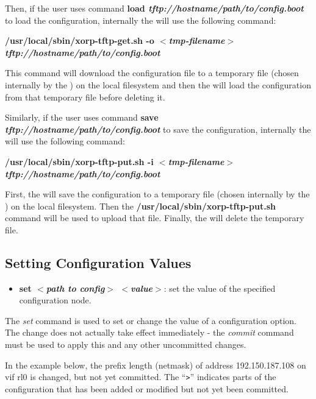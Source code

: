 Then, if the user uses \xorpsh command
\textbf{load \textit{tftp://hostname/path/to/config.boot}}
to load the configuration, internally the \rtrmgr will use the following
command:

\textbf{/usr/local/sbin/xorp-tftp-get.sh -o $<$\textit{tmp-filename}$>$
\textit{tftp://hostname/path/to/config.boot}}

This command will download the configuration file to a temporary file (chosen
internally by the \rtrmgr) on the local filesystem and then the \rtrmgr will
load the configuration from that temporary file before deleting it.

Similarly, if the user uses \xorpsh command
\textbf{save \textit{tftp://hostname/path/to/config.boot}}
to save the configuration, internally the \rtrmgr will use the following
command:

\textbf{/usr/local/sbin/xorp-tftp-put.sh -i $<$\textit{tmp-filename}$>$
\textit{tftp://hostname/path/to/config.boot}}

First, the \rtrmgr will save the configuration to a temporary file (chosen
internally by the \rtrmgr) on the local filesystem. Then the
\textbf{/usr/local/sbin/xorp-tftp-put.sh} command will be used to upload that
file. Finally, the \rtrmgr will delete the temporary file.

\newpage
\subsection{Setting Configuration Values}

\begin{itemize}
\item \textbf{set $<$\textit{path to config}$>$
$<$\textit{value}$>$}: set the value of the specified configuration
node.
\end{itemize}
The \emph{set} command is used to set or change the value of a configuration
option.  The change does not actually take effect immediately - the
\emph{commit} command must be used to apply this and any other uncommitted
changes.

In the example below, the prefix length (netmask) of address
192.150.187.108 on vif rl0 is changed, but not yet committed.  The
``{\tt >}'' indicates parts of the configuration that has been added
or modified but not yet been committed.
\vspace{0.1in}

